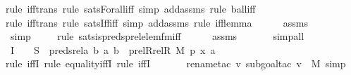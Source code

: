 \begin{isabellebody}
{\isacharparenleft}{\kern0pt}rule\ iff{\isacharunderscore}{\kern0pt}trans{\isacharcomma}{\kern0pt}\ rule\ sats{\isacharunderscore}{\kern0pt}Forall{\isacharunderscore}{\kern0pt}iff{\isacharcomma}{\kern0pt}\ simp\ add{\isacharcolon}{\kern0pt}assms{\isacharcomma}{\kern0pt}\ rule\ ball{\isacharunderscore}{\kern0pt}iff{\isacharparenright}{\kern0pt}\isanewline
\ \ \ \ \isamarkupfalse%
{\isacharparenleft}{\kern0pt}rule\ iff{\isacharunderscore}{\kern0pt}trans{\isacharcomma}{\kern0pt}\ rule\ sats{\isacharunderscore}{\kern0pt}Iff{\isacharunderscore}{\kern0pt}iff{\isacharcomma}{\kern0pt}\ simp\ add{\isacharcolon}{\kern0pt}assms{\isacharcomma}{\kern0pt}\ rule\ iff{\isacharunderscore}{\kern0pt}lemma{\isacharparenright}{\kern0pt}\isanewline
\ \ \ \ \isamarkupfalse%
\ assms\ \isanewline
\ \ \ \ \ \isamarkupfalse%
\ simp\isanewline
\ \ \ \ \isamarkupfalse%
{\isacharparenleft}{\kern0pt}rule\ sats{\isacharunderscore}{\kern0pt}is{\isacharunderscore}{\kern0pt}preds{\isacharunderscore}{\kern0pt}prel{\isacharunderscore}{\kern0pt}elem{\isacharunderscore}{\kern0pt}fm{\isacharunderscore}{\kern0pt}iff{\isacharparenright}{\kern0pt}\isanewline
\ \ \ \ \isamarkupfalse%
\ assms\ \isanewline
\ \ \ \ \isamarkupfalse%
\ simp{\isacharunderscore}{\kern0pt}all\isanewline
\ \ \isamarkupfalse%
\ I{}\ {\isacharcolon}{\kern0pt}\ {\isachardoublequoteopen}{\isachardot}{\kern0pt}{\isachardot}{\kern0pt}{\isachardot}{\kern0pt}\ {\isasymlongleftrightarrow}\ S\ {\isacharequal}{\kern0pt}\ preds{\isacharunderscore}{\kern0pt}rel{\isacharparenleft}{\kern0pt}{\isasymlambda}a\ b{\isachardot}{\kern0pt}\ {\isacharless}{\kern0pt}a{\isacharcomma}{\kern0pt}\ b{\isachargreater}{\kern0pt}\ {\isasymin}\ prel{\isacharparenleft}{\kern0pt}Rrel{\isacharparenleft}{\kern0pt}R{\isacharcomma}{\kern0pt}\ M{\isacharparenright}{\kern0pt}{\isacharcomma}{\kern0pt}\ p{\isacharparenright}{\kern0pt}{\isacharcomma}{\kern0pt}\ {\isacharless}{\kern0pt}x{\isacharcomma}{\kern0pt}\ a{\isachargreater}{\kern0pt}{\isacharparenright}{\kern0pt}{\isachardoublequoteclose}\ \isanewline
\ \ \ \ \isamarkupfalse%
{\isacharparenleft}{\kern0pt}rule\ iffI{\isacharcomma}{\kern0pt}\ rule\ equality{\isacharunderscore}{\kern0pt}iffI{\isacharcomma}{\kern0pt}\ rule\ iffI{\isacharparenright}{\kern0pt}\isanewline
\ \ \ \ \ \ \isamarkupfalse%
{\isacharparenleft}{\kern0pt}rename{\isacharunderscore}{\kern0pt}tac\ v{\isacharcomma}{\kern0pt}\ subgoal{\isacharunderscore}{\kern0pt}tac\ {\isachardoublequoteopen}v\ {\isasymin}\ M{\isachardoublequoteclose}{\isacharcomma}{\kern0pt}\ simp{\isacharparenright}{\kern0pt}\isanewline

\end{isabellebody}
